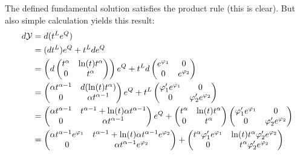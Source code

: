 \begin{rem}
  The defined fundamental solution satisfies the product rule (this is clear).
  But also simple calculation yields this result:
  \begin{align*}
    d\cY&=d(t^Le^Q)
    \\&=(dt^L)e^Q + t^Lde^Q
    \\&=\left(d\begin{pmatrix}
      t^\alpha & \ln(t)t^\alpha \\ 0 & t^\alpha
    \end{pmatrix}\right)e^Q
    +
    t^Ld\begin{pmatrix}
      e^{\phi_1} & 0 \\ 0 & e^{\phi_2}
    \end{pmatrix}
    \\&=\begin{pmatrix}
      \alpha t^{\alpha-1} & d(\ln(t)t^\alpha) \\ 0 & \alpha t^{\alpha-1}
    \end{pmatrix}e^Q
    +
    t^L\begin{pmatrix}
      \phi_1'e^{\phi_1} & 0 \\ 0 & \phi_2'e^{\phi_2}
    \end{pmatrix}
    \\&=\begin{pmatrix}
    \alpha t^{\alpha-1} & t^{\alpha-1} + \ln(t)\alpha t^{\alpha-1}
      \\ 0 & \alpha t^{\alpha-1}
    \end{pmatrix}e^Q
    +
    \begin{pmatrix}
      t^\alpha & \ln(t)t^\alpha \\ 0 & t^\alpha
    \end{pmatrix} \begin{pmatrix}
      \phi_1'e^{\phi_1} & 0 \\ 0 & \phi_2'e^{\phi_2}
    \end{pmatrix}
    \\&=\begin{pmatrix}
      \alpha t^{\alpha-1}e^{\phi_1} 
    & t^{\alpha-1}+\ln(t)\alpha t^{\alpha-1}e^{\phi_2}
      \\ 0 & \alpha t^{\alpha-1}e^{\phi_2}
    \end{pmatrix}
    +
    \begin{pmatrix}
      t^\alpha\phi_1'e^{\phi_1} & \ln(t)t^\alpha\phi_2'e^{\phi_2}
      \\ 0 & t^\alpha\phi_2'e^{\phi_2}
    \end{pmatrix}

\end{align*}
\end{rem}
